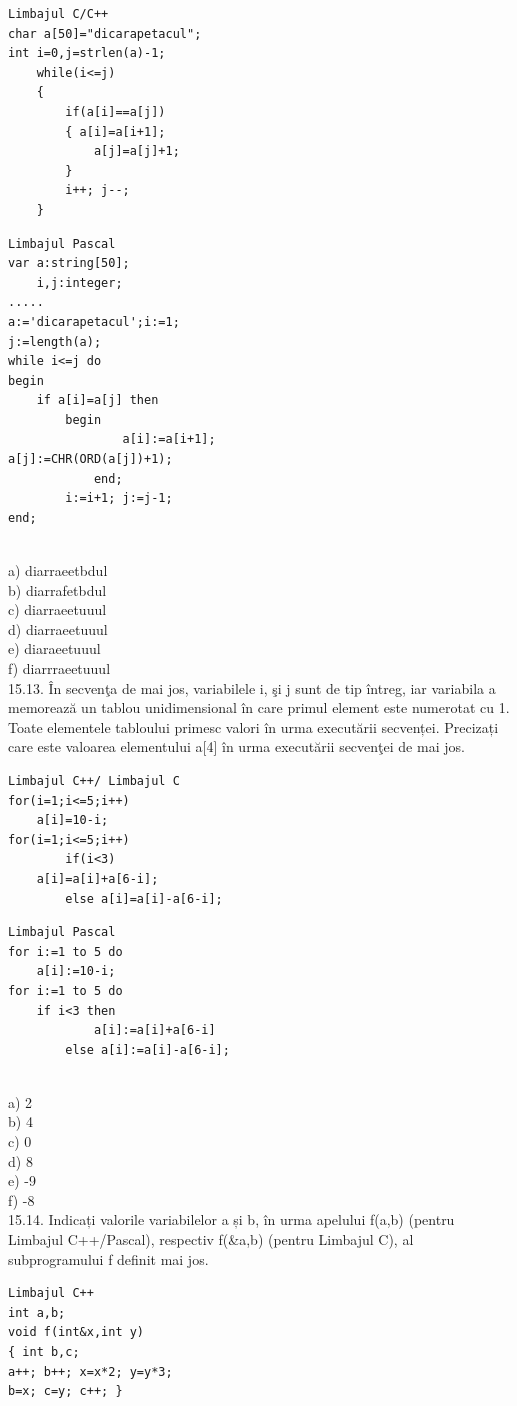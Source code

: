 {{\begin{verbatim}
Limbajul C/C++
char a[50]="dicarapetacul";
int i=0,j=strlen(a)-1;
    while(i<=j)
    {
        if(a[i]==a[j])
        { a[i]=a[i+1];
            a[j]=a[j]+1;
        }
        i++; j--;
    }
\end{verbatim}
\begin{verbatim}
Limbajul Pascal
var a:string[50];
    i,j:integer;
.....
a:='dicarapetacul';i:=1;
j:=length(a);
while i<=j do
begin
    if a[i]=a[j] then
        begin
                a[i]:=a[i+1];
a[j]:=CHR(ORD(a[j])+1);
            end;
        i:=i+1; j:=j-1;
end;
\end{verbatim}
\\
a) diarraeetbdul
\\
b) diarrafetbdul
\\
c) diarraeetuuul
\\
d) diarraeetuuul
\\
e) diaraeetuuul
\\
f) diarrraeetuuul
\\
15.13. În secvenţa de mai jos, variabilele i, şi j sunt de tip întreg, iar variabila a memorează un tablou unidimensional în care primul element este numerotat cu 1. Toate elementele tabloului primesc valori în urma executării secvenței. Precizați care este valoarea elementului a[4] în urma executării secvenţei de mai jos.
\begin{verbatim}
Limbajul C++/ Limbajul C
for(i=1;i<=5;i++)
    a[i]=10-i;
for(i=1;i<=5;i++)
        if(i<3)
    a[i]=a[i]+a[6-i];
        else a[i]=a[i]-a[6-i];
\end{verbatim}
\begin{verbatim}
Limbajul Pascal
for i:=1 to 5 do
    a[i]:=10-i;
for i:=1 to 5 do
    if i<3 then
            a[i]:=a[i]+a[6-i]
        else a[i]:=a[i]-a[6-i];
\end{verbatim}
\\
a) 2
\\
b) 4
\\
c) 0
\\
d) 8
\\
e) -9
\\
f) -8
\\
15.14. Indicați  valorile  variabilelor  a  și  b,    în  urma  apelului  f(a,b)  (pentru  Limbajul 
C++/Pascal),  respectiv  f(\&a,b)  (pentru  Limbajul  C),  al  subprogramului  f  definit 
mai jos.
\begin{verbatim}
Limbajul C++ 
int a,b; 
void f(int&x,int y) 
{ int b,c;  
a++; b++; x=x*2; y=y*3;   
b=x; c=y; c++; }

\end{verbatim}}}
